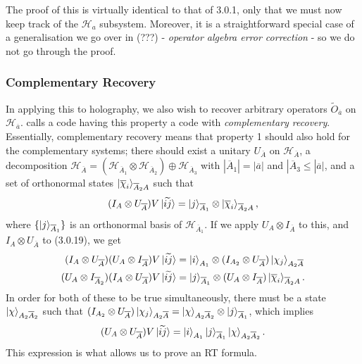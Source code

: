 \documentclass[12pt,a4paper]{report}
\numberwithin{equation}{section}
\newcommand{\ol}[1]{\overline{#1}}
\theoremstyle{definition}
\theoremstyle{theorem}
\theoremstyle{theorem}
\theoremstyle{example}
\theoremstyle{definition}
\begin{document}
The proof of this is virtually identical to that of 3.0.1, only that we must now keep track of the $\mathcal{H}_{a}$ subsystem. Moreover, it is a straightforward special case of a generalisation we go over in (???) - \textit{operator algebra error correction} - so we do not go through the proof.
\subsubsection{Complementary Recovery}
In applying this to holography, we also wish to recover arbitrary operators $\tilde{O}_{\ol{a}}$ on $\mathcal{H}_{\ol{a}}$. \cite{Harlow} calls a code having this property a code with \textit{complementary recovery}. Essentially, complementary recovery means that property 1 should also hold for the complementary systems; there should exist a unitary $U_{\ol{A}}$ on $\mathcal{H}_{\ol{A}}$, a decomposition $\mathcal{H}_{\ol{A}}=(\mathcal{H}_{\ol{A}_{1}}\otimes\mathcal{H}_{\ol{A}_{2}})\oplus\mathcal{H}_{\ol{A}_{3}}$ with $|\ol{A}_{1}|=|\ol{a}|$ and $|\ol{A}_{3}\leq|\ol{a}|$, and a set of orthonormal states $\ket{\ol{\chi}_{i}}_{\ol{A}_{2}A}$ such that
\begin{equation}
	(I_{A}\otimes U_{\ol{A}})V\ket{\widetilde{ij}}=\ket{j}_{\ol{A}_{1}}\otimes\ket{\ol{\chi}_{i}}_{\ol{A}_{2}A},
\end{equation}
where $\{\ket{j}_{\ol{A}_{1}}\}$ is an orthonormal basis of $\mathcal{H}_{\ol{A}_{1}}$. If we apply $U_{A}\otimes I_{\ol{A}}$ to this, and $I_{A}\otimes U_{\ol{A}}$ to (3.0.19), we get
\begin{equation}
	\begin{aligned}
		(I_{A}\otimes U_{\ol{A}})(U_{A}\otimes I_{\ol{A}})V\ket{\widetilde{ij}}&=\ket{i}_{A_{1}}\otimes (I_{A_{2}}\otimes U_{\ol{A}})\ket{\chi_{j}}_{A_{2}\ol{A}}\\
		(U_{A}\otimes I_{\ol{A}_{2}})(I_{A}\otimes U_{\ol{A}})V\ket{\widetilde{ij}}&=\ket{j}_{\ol{A}_{1}}\otimes (U_{A}\otimes I_{\ol{A}})\ket{\ol{\chi}_{i}}_{\ol{A}_{2}A}.
	\end{aligned}
\end{equation}
In order for both of these to be true simultaneously, there must be a state $\ket{\chi}_{A_{2}\ol{A}_{2}}$ such that
$(I_{A_{2}}\otimes U_{\ol{A}})\ket{\chi_{j}}_{A_{2}\ol{A}}=\ket{\chi}_{A_{2}\ol{A}_{2}}\otimes\ket{j}_{\ol{A}_{1}}$, which implies
\begin{equation}
	(U_{A}\otimes U_{\ol{A}})V\ket{\widetilde{ij}}=\ket{i}_{A_{1}}\ket{j}_{\ol{A}_{1}}\ket{\chi}_{A_{2}\ol{A}_{2}}.
\end{equation}
This expression is what allows us to prove an RT formula.
\end{document}
